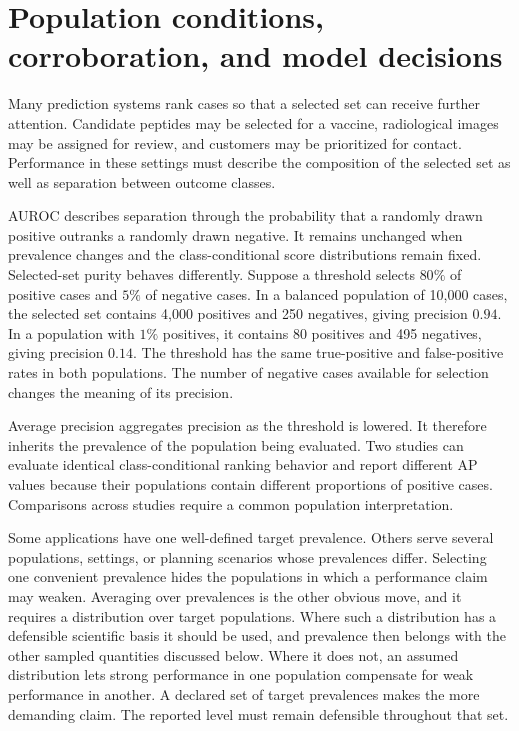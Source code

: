 \documentclass[11pt]{article}
\theoremstyle{remark}
\begin{document}
\newpage

\section{Population conditions, corroboration, and model decisions}
\label{sec:motivation}

Many prediction systems rank cases so that a selected set can receive further attention. Candidate peptides may be selected for a vaccine, radiological images may be assigned for review, and customers may be prioritized for contact. Performance in these settings must describe the composition of the selected set as well as separation between outcome classes.

AUROC describes separation through the probability that a randomly drawn positive outranks a randomly drawn negative. It remains unchanged when prevalence changes and the class-conditional score distributions remain fixed. Selected-set purity behaves differently. Suppose a threshold selects $80\%$ of positive cases and $5\%$ of negative cases. In a balanced population of 10,000 cases, the selected set contains 4,000 positives and 250 negatives, giving precision $0.94$. In a population with $1\%$ positives, it contains 80 positives and 495 negatives, giving precision $0.14$. The threshold has the same true-positive and false-positive rates in both populations. The number of negative cases available for selection changes the meaning of its precision.

Average precision aggregates precision as the threshold is lowered. It therefore inherits the prevalence of the population being evaluated. Two studies can evaluate identical class-conditional ranking behavior and report different AP values because their populations contain different proportions of positive cases. Comparisons across studies require a common population interpretation.

Some applications have one well-defined target prevalence. Others serve several populations, settings, or planning scenarios whose prevalences differ. Selecting one convenient prevalence hides the populations in which a performance claim may weaken. Averaging over prevalences is the other obvious move, and it requires a distribution over target populations. Where such a distribution has a defensible scientific basis it should be used, and prevalence then belongs with the other sampled quantities discussed below. Where it does not, an assumed distribution lets strong performance in one population compensate for weak performance in another. A declared set of target prevalences makes the more demanding claim. The reported level must remain defensible throughout that set.
\end{document}
